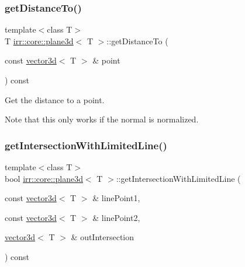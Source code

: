 \subsubsection{\texorpdfstring{get\+Distance\+To()}{getDistanceTo()}\hspace{0.1cm}{\footnotesize\ttfamily [2/2]}}
{\footnotesize\ttfamily template$<$class T$>$ \\
T \hyperlink{classirr_1_1core_1_1plane3d}{irr\+::core\+::plane3d}$<$ T $>$\+::get\+Distance\+To (\begin{DoxyParamCaption}\item[{const \hyperlink{classirr_1_1core_1_1vector3d}{vector3d}$<$ T $>$ \&}]{point }\end{DoxyParamCaption}) const\hspace{0.3cm}{\ttfamily [inline]}}



Get the distance to a point. 

Note that this only works if the normal is normalized. \mbox{\label{classirr_1_1core_1_1plane3d_a6bec8dcaa0eeb9f7bdd5b727f3d3561d}} 
\subsubsection{\texorpdfstring{get\+Intersection\+With\+Limited\+Line()}{getIntersectionWithLimitedLine()}\hspace{0.1cm}{\footnotesize\ttfamily [1/2]}}
{\footnotesize\ttfamily template$<$class T$>$ \\
bool \hyperlink{classirr_1_1core_1_1plane3d}{irr\+::core\+::plane3d}$<$ T $>$\+::get\+Intersection\+With\+Limited\+Line (\begin{DoxyParamCaption}\item[{const \hyperlink{classirr_1_1core_1_1vector3d}{vector3d}$<$ T $>$ \&}]{line\+Point1,  }\item[{const \hyperlink{classirr_1_1core_1_1vector3d}{vector3d}$<$ T $>$ \&}]{line\+Point2,  }\item[{\hyperlink{classirr_1_1core_1_1vector3d}{vector3d}$<$ T $>$ \&}]{out\+Intersection }\end{DoxyParamCaption}) const\hspace{0.3cm}{\ttfamily [inline]}}



